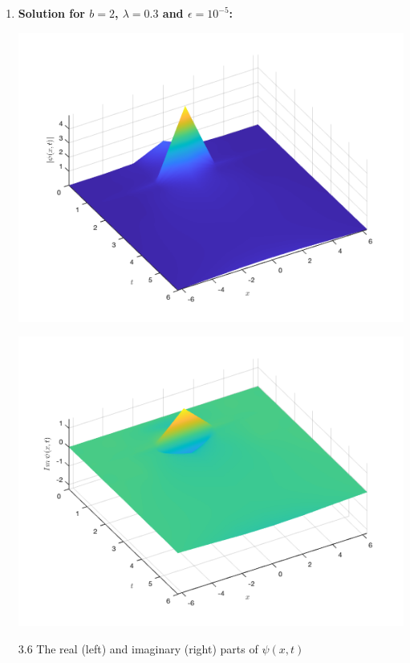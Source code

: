 \documentclass[12pt, letterpaper, twoside]{article}
\begin{document}
\begin{enumerate}[label=(\roman*)]
    \item \textbf{Solution for $b=2$, $\lambda=0.3$ and $\epsilon=10^{-5}$:}
   \begin{multicols}{2}
        \begin{center}
            \includegraphics[scale=0.35]{with friction/b2real.png}
        \end{center} 
        \begin{center}
            \includegraphics[scale=0.35]{with friction/b2imag.png}
        \end{center}  
    \end{multicols}
    \figurename{ 3.6 The real (left) and imaginary (right) parts of $\psi(x, t)$}
\end{enumerate}
\end{document}
